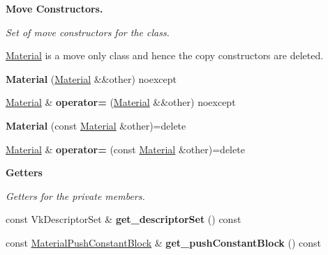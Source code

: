 \begin{Indent}\textbf{ Move Constructors.}\par
{\em Set of move constructors for the class.

\hyperlink{classblaze_1_1Material}{Material} is a move only class and hence the copy constructors are deleted. }\begin{DoxyCompactItemize}
\item 
\mbox{\label{classblaze_1_1Material_a6849b6d64614437f7adba89cc0c79111}} 
{\bfseries Material} (\hyperlink{classblaze_1_1Material}{Material} \&\&other) noexcept
\item 
\mbox{\label{classblaze_1_1Material_a795b2398d73289e301de64e50adef75f}} 
\hyperlink{classblaze_1_1Material}{Material} \& {\bfseries operator=} (\hyperlink{classblaze_1_1Material}{Material} \&\&other) noexcept
\item 
\mbox{\label{classblaze_1_1Material_a13350238237fda6867111073a08b593e}} 
{\bfseries Material} (const \hyperlink{classblaze_1_1Material}{Material} \&other)=delete
\item 
\mbox{\label{classblaze_1_1Material_a205bb3d59f0858e9091a081a0b15ee7a}} 
\hyperlink{classblaze_1_1Material}{Material} \& {\bfseries operator=} (const \hyperlink{classblaze_1_1Material}{Material} \&other)=delete
\end{DoxyCompactItemize}
\end{Indent}
\begin{Indent}\textbf{ Getters}\par
{\em Getters for the private members. }\begin{DoxyCompactItemize}
\item 
\mbox{\label{classblaze_1_1Material_a7c213db75df559401986d68fa7b964f2}} 
const Vk\+Descriptor\+Set \& {\bfseries get\+\_\+descriptor\+Set} () const
\item 
\mbox{\label{classblaze_1_1Material_a4097564b736b3fa1fb6c18c5e60dfe59}} 
const \hyperlink{structblaze_1_1MaterialPushConstantBlock}{Material\+Push\+Constant\+Block} \& {\bfseries get\+\_\+push\+Constant\+Block} () const
\end{DoxyCompactItemize}
\end{Indent}


